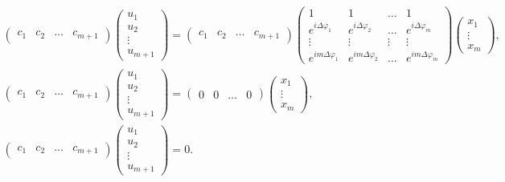 \begin{gather*}
    \begin{pmatrix}
        c_1 & c_2 & \dots & c_{m+1}
    \end{pmatrix}
    \begin{pmatrix}
        u_1    \\
        u_2    \\
        \vdots \\
        u_{m+1}
    \end{pmatrix}
    = \begin{pmatrix}
        c_1 & c_2 & \dots & c_{m+1}
    \end{pmatrix}
    \begin{pmatrix}
        1                        & 1                        & \dots  & 1                        \\
        e^{i \Delta \varphi_1}   & e^{i \Delta \varphi_2}   & \dots  & e^{i \Delta \varphi_m}   \\
        \vdots                   & \vdots                   & \vdots & \vdots                   \\
        e^{i m \Delta \varphi_1} & e^{i m \Delta \varphi_2} & \dots  & e^{i m \Delta \varphi_m}
    \end{pmatrix}
    \begin{pmatrix}
        x_1    \\
        \vdots \\
        x_m
    \end{pmatrix} , \\
    \begin{pmatrix}
        c_1 & c_2 & \dots & c_{m+1}
    \end{pmatrix}
    \begin{pmatrix}
        u_1    \\
        u_2    \\
        \vdots \\
        u_{m+1}
    \end{pmatrix}
    = \begin{pmatrix}
        0 & 0 & \dots & 0
    \end{pmatrix}
    \begin{pmatrix}
        x_1    \\
        \vdots \\
        x_m
    \end{pmatrix} , \\
    \begin{pmatrix}
        c_1 & c_2 & \dots & c_{m+1}
    \end{pmatrix}
    \begin{pmatrix}
        u_1    \\
        u_2    \\
        \vdots \\
        u_{m+1}
    \end{pmatrix}
    = 0 .
\end{gather*}

